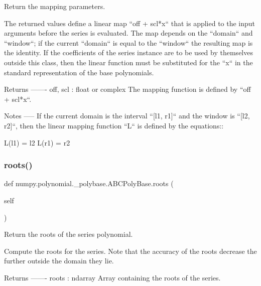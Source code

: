 \begin{DoxyVerb}Return the mapping parameters.

The returned values define a linear map ``off + scl*x`` that is
applied to the input arguments before the series is evaluated. The
map depends on the ``domain`` and ``window``; if the current
``domain`` is equal to the ``window`` the resulting map is the
identity.  If the coefficients of the series instance are to be
used by themselves outside this class, then the linear function
must be substituted for the ``x`` in the standard representation of
the base polynomials.

Returns
-------
off, scl : float or complex
    The mapping function is defined by ``off + scl*x``.

Notes
-----
If the current domain is the interval ``[l1, r1]`` and the window
is ``[l2, r2]``, then the linear mapping function ``L`` is
defined by the equations::

    L(l1) = l2
    L(r1) = r2\end{DoxyVerb}
 \mbox{\label{classnumpy_1_1polynomial_1_1__polybase_1_1ABCPolyBase_ab16160a3c047fca4324c3f4dd88da397}} 
\subsubsection{\texorpdfstring{roots()}{roots()}}
{\footnotesize\ttfamily def numpy.\+polynomial.\+\_\+polybase.\+A\+B\+C\+Poly\+Base.\+roots (\begin{DoxyParamCaption}\item[{}]{self }\end{DoxyParamCaption})}

\begin{DoxyVerb}Return the roots of the series polynomial.

Compute the roots for the series. Note that the accuracy of the
roots decrease the further outside the domain they lie.

Returns
-------
roots : ndarray
    Array containing the roots of the series.\end{DoxyVerb}
 \mbox{\label{classnumpy_1_1polynomial_1_1__polybase_1_1ABCPolyBase_ac62976cac19f9a881a678adcfd7f4a0c}} 
